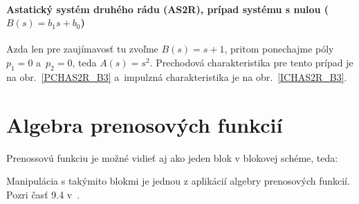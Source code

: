 \documentclass[a4paper, 10pt, ]{article}
\begin{document}
\paragraph{Astatický systém druhého rádu (AS2R), prípad systému s nulou ($B(s) = b_1 s + b_0$)}

Azda len pre zaujímavosť tu zvoľme $B(s) =  s + 1$, pritom ponechajme póly $p_1 = 0$ a~$p_2 = 0$, teda $A(s) = s^2$.  Prechodová charakteristika pre tento prípad je na obr.~\ref{PCHAS2R_B3} a~impulzná charakteristika je na obr.~\ref{ICHAS2R_B3}.

\begin{center}


	\label{PCHAS2R_B3}

\end{center}

\begin{center}


	\label{ICHAS2R_B3}

\end{center}









\pagebreak

\section{Algebra prenosových funkcií}

Prenossovú funkciu je možné vidieť aj ako jeden blok v blokovej schéme, teda:


\begin{center}

    \makebox[\textwidth][c]{%
    
    }

	\label{TFalgebra_lenG}

\end{center}

Manipulácia s takýmito blokmi je jednou z aplikácií algebry prenosových funkcií. Pozri časť 9.4 v~\cite{AsM08se}.
\end{document}
